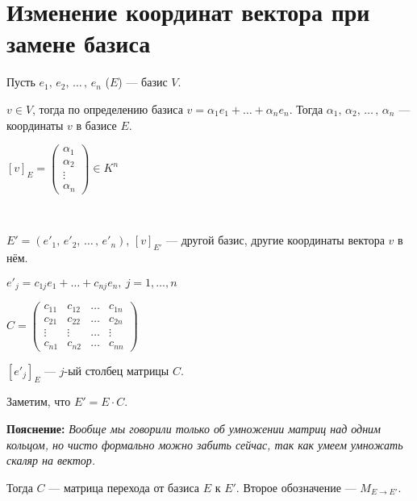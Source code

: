 
\section{Изменение координат вектора при замене базиса}

\begin{conj} 
    
    Пусть $e_1,\, e_2,\, \dots\, ,\, e_n$ ($E$) --- базис $V$. 
    
    $v \in V$, тогда по определению базиса $v = \alpha_1 e_1 + \dots + \alpha_n e_n$. 
    Тогда $\alpha_1,\, \alpha_2,\, \dots\, ,\, \alpha_n$ --- координаты $v$ в базисе $E$.

    $[v]_E =
        \begin{pmatrix}
            \alpha_1\\
            \alpha_2\\
            \vdots\\
            \alpha_n
        \end{pmatrix}
    \in K^n$
\end{conj}
\
\begin{conj}


    $E' = (e'_1,\, e'_2,\, \dots\, ,\, e'_n)$, $[v]_{E'}$ --- другой базис, другие координаты вектора $v$ в нём.

    $e'_j = c_{1j}e_1 + \dots + c_{nj}e_n,\ j = 1, \dots, n$

    $C =
        \begin{pmatrix}
            c_{11} & c_{12} & \dots & c_{1n} \\
            c_{21} & c_{22} & \dots & c_{2n} \\
            \vdots & \vdots & \dots & \vdots \\
            c_{n1} & c_{n2} & \dots & c_{nn}
        \end{pmatrix}
    $

    $[e'_j]_E$ --- $j$-ый столбец матрицы $C$.

    Заметим, что $E' = E \cdot C$.


    \textbf{Пояснение:}
    \emph{Вообще мы говорили только об умножении матриц над одним кольцом, но чисто формально можно забить сейчас, так как умеем умножать скаляр на вектор.}

    Тогда $C$ --- матрица перехода от базиса $E$ к $E'$. Второе обозначение --- $M_{E \to E'}$.


\end{conj}
\
